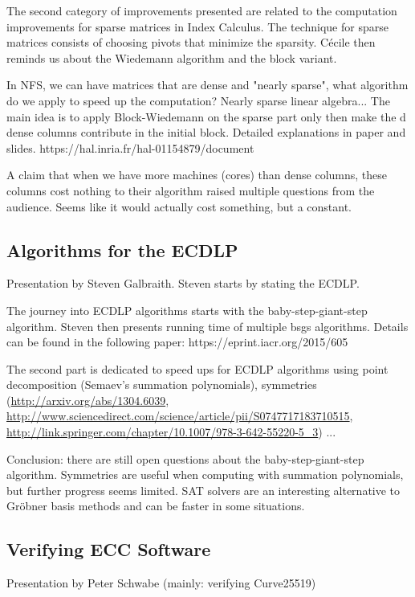 \documentclass[11pt]{article}
\begin{document}
The second category of improvements presented are related to the computation improvements for sparse matrices in Index Calculus. The technique for sparse matrices consists of choosing pivots that minimize the sparsity. Cécile then reminds us about the Wiedemann algorithm and the block variant.

In NFS, we can have matrices that are dense and "nearly sparse", what algorithm do we apply to speed up the computation? Nearly sparse linear algebra...
The main idea is to apply Block-Wiedemann on the sparse part only then make the d dense columns contribute in the initial block. Detailed explanations in paper and slides. https://hal.inria.fr/hal-01154879/document

A claim that when we have more machines (cores) than dense columns, these columns cost nothing to their algorithm raised multiple questions from the audience. Seems like it would actually cost something, but a constant.

\subsection{Algorithms for the ECDLP}

Presentation by Steven Galbraith. Steven starts by stating the ECDLP.

The journey into ECDLP algorithms starts with the baby-step-giant-step algorithm. Steven then presents running time of multiple bsgs algorithms. Details can be found in the following paper: https://eprint.iacr.org/2015/605

The second part is dedicated to speed ups for ECDLP algorithms using point decomposition (Semaev's summation polynomials), symmetries (\url{http://arxiv.org/abs/1304.6039}, \url{http://www.sciencedirect.com/science/article/pii/S0747717183710515}, \url{http://link.springer.com/chapter/10.1007/978-3-642-55220-5_3}) ...

Conclusion: there are still open questions about the baby-step-giant-step algorithm. Symmetries are useful when computing with summation polynomials, but further progress seems limited. SAT solvers are an interesting alternative to Gröbner basis methods and can be faster in some situations.

\subsection{Verifying ECC Software}
Presentation by Peter Schwabe
(mainly: verifying Curve25519)
\end{document}
